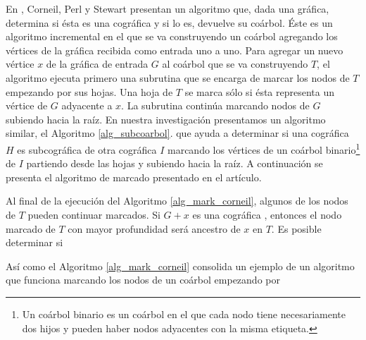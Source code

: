 En \cite{Corneil02}, Corneil, Perl y Stewart presentan un algoritmo que, 
dada una gráfica, determina si ésta es una cográfica y si lo es, devuelve
su coárbol. Éste es un algoritmo incremental en el que se va construyendo 
un coárbol agregando los vértices de la gráfica recibida como entrada uno 
a uno. Para agregar un nuevo vértice $x$ de la gráfica de entrada $G$ al 
coárbol que se va construyendo $T$, el algoritmo ejecuta primero una 
subrutina que se encarga de marcar los nodos de $T$ empezando por sus 
hojas. Una hoja de $T$ se marca sólo si ésta representa un vértice de $G$ 
adyacente a $x$. La subrutina continúa marcando nodos de $G$ subiendo hacia
la raíz. En nuestra investigación presentamos un algoritmo similar, el 
Algoritmo \ref{alg_subcoarbol}. que ayuda a determinar si una cográfica 
$H$ es subcográfica de otra cográfica $I$ marcando los vértices de un 
coárbol binario\footnote{Un coárbol binario es un coárbol en el que cada 
nodo tiene necesariamente dos hijos y pueden haber nodos adyacentes con la 
misma etiqueta.} de $I$ partiendo desde las hojas y subiendo hacia la raíz.
A continuación se presenta el algoritmo de marcado presentado en el artículo.


Al final de la ejecución del Algoritmo \ref{alg_mark_corneil}, algunos de los nodos de $T$ pueden continuar marcados. Si $G+x$ es una cográfica , entonces el nodo marcado de $T$ con mayor profundidad será ancestro de $x$ en $T$. Es posible determinar si 





Así como el Algoritmo \ref{alg_mark_corneil} consolida un ejemplo de un algoritmo que funciona marcando los nodos de un coárbol empezando por 

